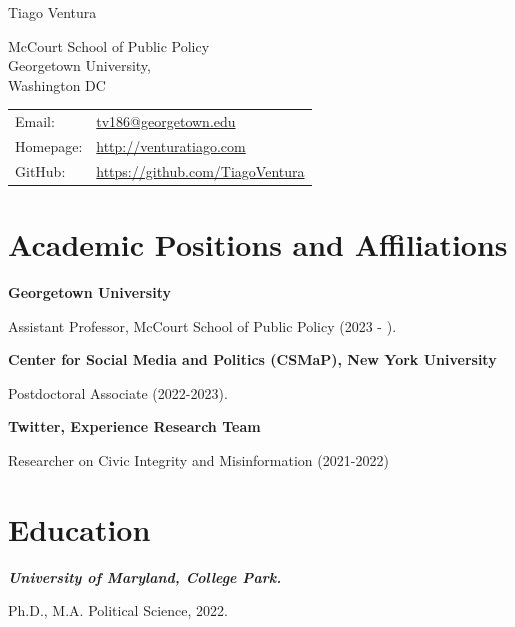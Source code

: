 \documentclass[letterpaper, 11pt]{article}
\def\name{Tiago Ventura}
\begin{document}
    {\huge \name}


    \vspace{0.25in}

    \begin{minipage}{0.45\linewidth}
        McCourt School of Public Policy\\
        Georgetown University,  \\
        Washington DC
    \end{minipage}
    \begin{minipage}{0.45\linewidth}
        \begin{tabular}{ll}
            Email:          & \href{mailto:tv186@georgetown.edu}{tv186@georgetown.edu}          \\
            Homepage:       & \href{http://venturatiago.com/}{http://venturatiago.com}             \\
            GitHub:         & \href{https://github.com/TiagoVentura}{https://github.com/TiagoVentura}
        \end{tabular}
    \end{minipage}


\section*{Academic Positions and Affiliations}

{\textbf{Georgetown University}}

Assistant Professor, McCourt School of Public Policy (2023 - ).
\vspace{.3cm}

{\textbf{Center for Social Media and Politics (CSMaP), New York University}}

Postdoctoral Associate (2022-2023).

\vspace{.3cm}

\textbf{Twitter, Experience Research Team}

Researcher on Civic Integrity and Misinformation (2021-2022)

\section*{Education}

\textit{\textbf{University of Maryland, College Park.}}

Ph.D., M.A. Political Science, 2022.
\end{document}
